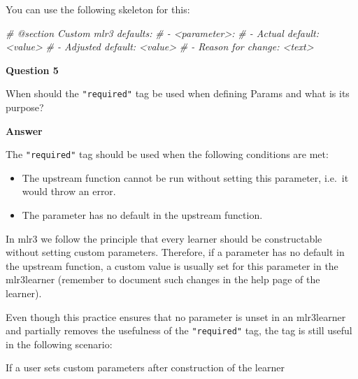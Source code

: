 \documentclass[
]{scrbook}
\newenvironment{Shaded}{\begin{snugshade}}{\end{snugshade}}
\newcommand{\CommentTok}[1]{\textcolor[rgb]{0.56,0.35,0.01}{\textit{#1}}}
\newcommand{\ErrorTok}[1]{\textcolor[rgb]{0.64,0.00,0.00}{\textbf{#1}}}
\newcommand{\FunctionTok}[1]{\textcolor[rgb]{0.00,0.00,0.00}{#1}}
\newcommand{\NormalTok}[1]{#1}
\newcommand{\OtherTok}[1]{\textcolor[rgb]{0.56,0.35,0.01}{#1}}
\newcommand{\SpecialCharTok}[1]{\textcolor[rgb]{0.00,0.00,0.00}{#1}}
\newcommand{\StringTok}[1]{\textcolor[rgb]{0.31,0.60,0.02}{#1}}
\providecommand{\tightlist}{%
  \setlength{\itemsep}{0pt}\setlength{\parskip}{0pt}}
\renewenvironment{Shaded} {\begin{snugshade}\small} {\end{snugshade}}
\begin{document}
You can use the following skeleton for this:

\begin{Shaded}
\begin{Highlighting}[]
\CommentTok{\#\textquotesingle{} @section Custom mlr3 defaults:}
\CommentTok{\#\textquotesingle{} {-} \textasciigrave{}\textless{}parameter\textgreater{}\textasciigrave{}:}
\CommentTok{\#\textquotesingle{}   {-} Actual default: \textless{}value\textgreater{}}
\CommentTok{\#\textquotesingle{}   {-} Adjusted default: \textless{}value\textgreater{}}
\CommentTok{\#\textquotesingle{}   {-} Reason for change: \textless{}text\textgreater{}}
\end{Highlighting}
\end{Shaded}

\textbf{Question 5}

When should the \texttt{"required"} tag be used when defining Params and what is its purpose?

\textbf{Answer}

The \texttt{"required"} tag should be used when the following conditions are met:

\begin{itemize}
\tightlist
\item
  The upstream function cannot be run without setting this parameter, i.e.~it would throw an error.
\item
  The parameter has no default in the upstream function.
\end{itemize}

In mlr3 we follow the principle that every learner should be constructable without setting custom parameters.
Therefore, if a parameter has no default in the upstream function, a custom value is usually set for this parameter in the mlr3learner (remember to document such changes in the help page of the learner).

Even though this practice ensures that no parameter is unset in an mlr3learner and partially removes the usefulness of the \texttt{"required"} tag, the tag is still useful in the following scenario:

If a user sets custom parameters after construction of the learner

\begin{Shaded}
\end{Shaded}
\end{document}
